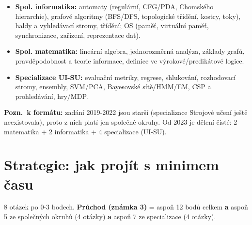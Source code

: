 \documentclass[11pt,a4paper]{article}
\begin{document}
\begin{infobox}[title={Nejčastější (= nejvýnosnější) okruhy}]
\begin{itemize}[leftmargin=1.2em]
  \item \textbf{Spol. informatika:} automaty (regulární, CFG/PDA, Chomského hierarchie),
  grafové algoritmy (BFS/DFS, topologické třídění, kostry, toky), haldy a vyhledávací stromy,
  třídění; OS (paměť, virtuální paměť, synchronizace, zařízení, reprezentace dat).
  \item \textbf{Spol. matematika:} lineární algebra, jednorozměrná analýza, základy grafů,
  pravděpodobnost a teorie informace, definice ve výrokové/predikátové logice.
  \item \textbf{Specializace UI-SU:} evaluační metriky, regrese, shlukování, rozhodovací stromy,
  ensembly, SVM/PCA, Bayesovské sítě/HMM/EM, CSP a prohledávání, hry/MDP.
\end{itemize}
\end{infobox}

\noindent\textbf{Pozn.\ k formátu:} zadání 2019-2022 jsou starší (specializace Strojové učení
ještě neexistovala), proto z nich platí jen společné okruhy. Od 2023 je dělení čisté:
2 matematika + 2 informatika + 4 specializace (UI-SU).

\section{Strategie: jak projít s minimem času}

\begin{infobox}[title={Bodový rozpočet (proč to stačí)}]
8 otázek po 0-3 bodech. \textbf{Průchod (známka 3)} = aspoň 12 bodů celkem \textbf{a} aspoň
5 ze společných okruhů (4 otázky) \textbf{a} aspoň 7 ze specializace (4 otázky).
\end{infobox}
\end{document}
